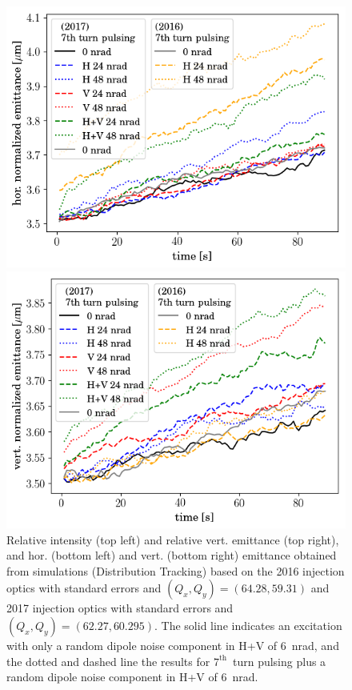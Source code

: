 \documentclass[%
 reprint,
 amsmath,amssymb,
 aps,
prstab,
]{revtex4-1}
\begin{document}
\begin{figure}[h]
\begin{minipage}[t]{0.49\linewidth}
		\centering
		\includegraphics[width=1.0\linewidth]{2016+2017injerra2b2uran1_2e-3_7th_3_5um_emit1.png}
	\end{minipage}	
	\begin{minipage}[t]{0.49\linewidth}
		\centering
		\includegraphics[width=1.0\linewidth]{2016+2017injerra2b2uran1_2e-3_7th_3_5um_emit2.png}
	\end{minipage}
	\caption{\label{fig:7thsim} Relative intensity (top left) and relative vert. emittance (top right), and hor. (bottom left) and vert. (bottom right) emittance obtained from simulations (Distribution Tracking) based on the 2016 injection optics with standard errors and $(Q_x,Q_y)=(64.28,59.31)$ and 2017 injection optics with standard errors and $(Q_x,Q_y)=(62.27,60.295)$. The solid line indicates an excitation with only a random dipole noise component in H+V of 6~nrad, and the dotted and dashed line the results for $7^{\mathrm{th}}$~turn pulsing plus a random dipole noise component in H+V of 6~nrad.}
\end{figure}
\end{document}

